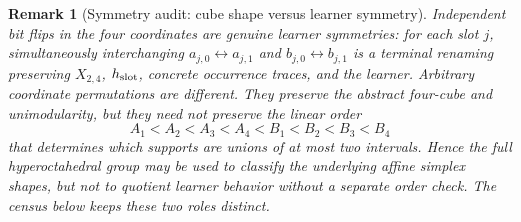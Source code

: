 \documentclass[11pt]{article}
\newtheorem{remark}[definition]{Remark}
\begin{document}
\begin{remark}[Symmetry audit: cube shape versus learner symmetry]
\label{rem:rank4-symmetry-audit}
Independent bit flips in the four coordinates are genuine learner symmetries:
for each slot $j$, simultaneously interchanging
$a_{j,0}\leftrightarrow a_{j,1}$ and
$b_{j,0}\leftrightarrow b_{j,1}$ is a terminal renaming preserving
$X_{2,4}$, $h_{\rm slot}$, concrete occurrence traces, and the learner.
Arbitrary coordinate permutations are different.  They preserve the abstract
four-cube and unimodularity, but they need not preserve the linear order
\[
 A_1<A_2<A_3<A_4<B_1<B_2<B_3<B_4
\]
that determines which supports are unions of at most two intervals.  Hence the
full hyperoctahedral group may be used to classify the underlying affine
simplex \emph{shapes}, but not to quotient learner behavior without a separate
order check.  The census below keeps these two roles distinct.
\end{remark}
\end{document}
